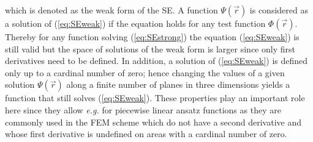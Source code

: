 which is denoted as the weak form of the SE.
A function $\Psi(\vec{r})$ is considered as a solution of (\ref{eq:SEweak}) if the equation holds for any test function $\Phi(\vec{r})$.
Thereby for any function solving (\ref{eq:SEstrong}) the equation (\ref{eq:SEweak}) is still valid but the space of solutions of the weak form is larger since only first derivatives need to be defined.
In addition, a solution of (\ref{eq:SEweak}) is defined only up to a cardinal number of zero; hence changing the values of a given solution $\Psi(\vec{r})$ along a finite number of planes in three dimensions yields a function that still solves (\ref{eq:SEweak}).
These properties play an important role here since they allow \textit{e.g.} for piecewise linear ansatz functions as they are commonly used in the FEM scheme which do not have a second derivative and whose first derivative is undefined on areas with a cardinal number of zero.


